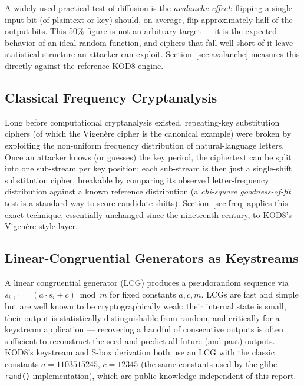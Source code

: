 \documentclass[11pt]{article}
\begin{document}
A widely used practical test of diffusion is the \emph{avalanche
effect}: flipping a single input bit (of plaintext or key) should, on
average, flip approximately half of the output bits. This 50\% figure
is not an arbitrary target --- it is the expected behavior of an ideal
random function, and ciphers that fall well short of it leave
statistical structure an attacker can exploit. Section~\ref{sec:avalanche}
measures this directly against the reference KOD8 engine.

\subsection{Classical Frequency Cryptanalysis}

Long before computational cryptanalysis existed, repeating-key
substitution ciphers (of which the Vigen\`ere cipher is the canonical
example) were broken by exploiting the non-uniform frequency
distribution of natural-language letters. Once an attacker knows (or
guesses) the key period, the ciphertext can be split into one
sub-stream per key position; each sub-stream is then just a
single-shift substitution cipher, breakable by comparing its observed
letter-frequency distribution against a known reference distribution
(a \emph{chi-square goodness-of-fit} test is a standard way to score
candidate shifts). Section~\ref{sec:freq} applies this exact technique,
essentially unchanged since the nineteenth century, to KOD8's
Vigen\`ere-style layer.

\subsection{Linear-Congruential Generators as Keystreams}

A linear congruential generator (LCG) produces a pseudorandom sequence
via $s_{i+1} = (a \cdot s_i + c) \bmod m$ for fixed constants $a, c, m$.
LCGs are fast and simple but are well known to be cryptographically
weak: their internal state is small, their output is statistically
distinguishable from random, and critically for a keystream
application --- recovering a handful of consecutive outputs is often
sufficient to reconstruct the seed and predict all future (and past)
outputs. KOD8's keystream and S-box derivation both use an LCG with the
classic constants $a=1103515245$, $c=12345$ (the same constants used by
the glibc \texttt{rand()} implementation), which are public knowledge
independent of this report.

\end{document}
